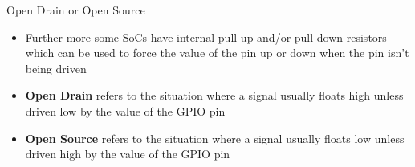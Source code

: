\begin{frame}
   {Open Drain or Open Source}
   \begin{itemize}
      \item Further more some SoCs have internal pull up and/or pull down resistors
            which can be used to force the value of the pin up or down when the
            pin isn't being driven
      \item \textbf{Open Drain} refers to the situation where a signal usually
	      floats high unless driven low by the value of the GPIO pin
      \item \textbf{Open Source} refers to the situation where a signal usually
	      floats low unless driven high by the value of the GPIO pin
   \end{itemize}
\end{frame}

\cprotect\note{


}

